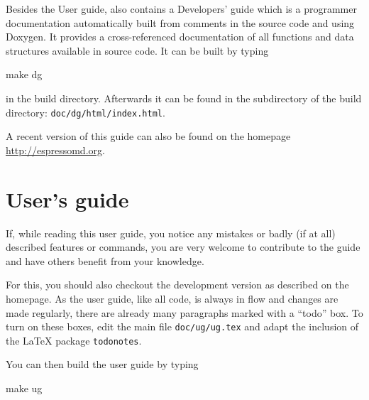 Besides the User guide, \es also contains a Developers' guide which is
a programmer documentation automatically built from comments in the
source code and using Doxygen.  It provides a cross-referenced
documentation of all functions and data structures available in \es
source code. It can be built by typing
\begin{code}
  make dg
\end{code}
in the build directory. Afterwards it can be found
in the subdirectory of the build directory: \texttt{doc/dg/html/index.html}.

A recent version of this guide can also be found on the \es{} homepage
\url{http://espressomd.org}.

\section{User's guide}

If, while reading this user guide, you notice any mistakes or badly
(if at all) described features or commands, you are very welcome to
contribute to the guide and have others benefit from your knowledge.

For this, you should also checkout the development version as
described on the homepage. As the user guide, like all \es{} code, is
always in flow and changes are made regularly, there are already many
paragraphs marked with a ``todo'' box. To turn on these boxes, edit
the main file \texttt{doc/ug/ug.tex} and adapt the inclusion of the
\LaTeX{} package \texttt{todonotes}.

You can then build the user guide by typing
\begin{code}
  make ug
\end{code}




